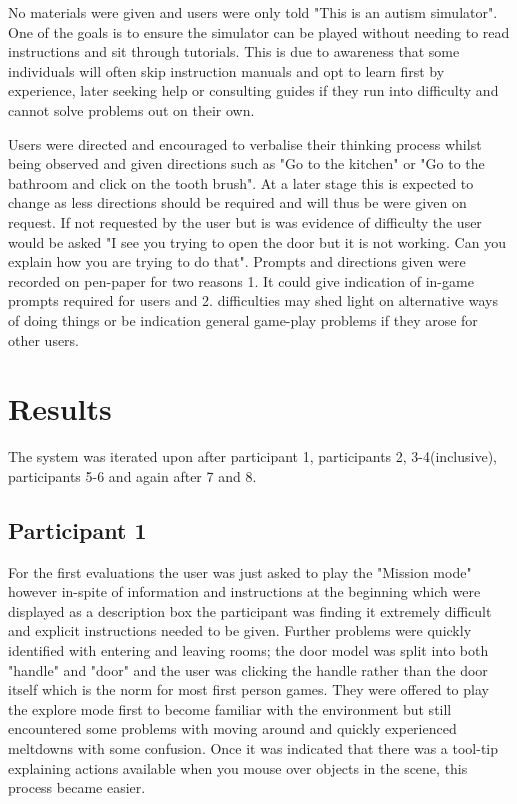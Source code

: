 \documentclass[11pt]{report}
\begin{document}
No materials were given and users were only told "This is an autism simulator". One of the goals is to ensure the simulator can be played without needing to read instructions and sit through tutorials. This is due to awareness that some individuals will often skip instruction manuals and opt to learn first by experience, later seeking help or consulting guides if they run into difficulty and cannot solve problems out on their own.

Users were directed and encouraged to verbalise their thinking process whilst being observed and given directions such as "Go to the kitchen" or "Go to the bathroom and click on the tooth brush". At a later stage this is expected to change as less directions should be required and will thus be were given on request. If not requested by the user but is was evidence of difficulty the user would be asked "I see you trying to open the door but it is not working. Can you explain how you are trying to do that". Prompts and directions given were recorded on pen-paper for two reasons 1. It could give indication of in-game prompts required for users and 2. difficulties may shed light on alternative ways of doing things or be indication general game-play problems if they arose for other users.

\section{Results}
The system was iterated upon after participant 1, participants 2, 3-4(inclusive), participants 5-6 and again after 7 and 8.

\subsection*{Participant 1}

For the first evaluations the user was just asked to play the "Mission mode" however in-spite of information and instructions at the beginning which were displayed as a description box the participant was finding it extremely difficult and explicit instructions needed to be given. Further problems were quickly identified with entering and leaving rooms; the door model was split into both "handle" and "door" and the user was clicking the handle rather than the door itself which is the norm for most first person games. They were offered to play the explore mode first to become familiar with the environment but still encountered some problems with moving around and quickly experienced meltdowns with some confusion. Once it was indicated that there was a tool-tip explaining actions available when you mouse over objects in the scene, this process became easier. 
\end{document}
